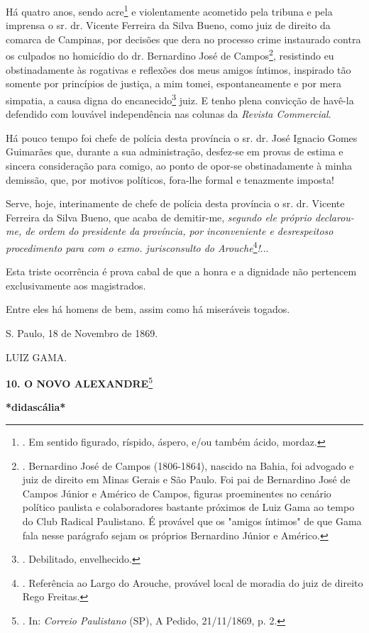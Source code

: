 Há quatro anos, sendo acre\footnote{. Em sentido figurado, ríspido,
  áspero, e/ou também ácido, mordaz.} e violentamente acometido pela
tribuna e pela imprensa o sr. dr. Vicente Ferreira da Silva Bueno, como
juiz de direito da comarca de Campinas, por decisões que dera no
processo crime instaurado contra os culpados no homicídio do dr.
Bernardino José de Campos\footnote{. Bernardino José de Campos
  (1806-1864), nascido na Bahia, foi advogado e juiz de direito em Minas
  Gerais e São Paulo. Foi pai de Bernardino José de Campos Júnior e
  Américo de Campos, figuras proeminentes no cenário político paulista e
  colaboradores bastante próximos de Luiz Gama ao tempo do Club Radical
  Paulistano. É provável que os "amigos íntimos" de que Gama fala nesse
  parágrafo sejam os próprios Bernardino Júnior e Américo.}, resistindo
eu obstinadamente às rogativas e reflexões dos meus amigos íntimos,
inspirado tão somente por princípios de justiça, a mim tomei,
espontaneamente e por mera simpatia, a causa digna do
encanecido\footnote{. Debilitado, envelhecido.} juiz. E tenho plena
convicção de havê-la defendido com louvável independência nas colunas da
\emph{Revista Commercial}.

Há pouco tempo foi chefe de polícia desta província o sr. dr. José
Ignacio Gomes Guimarães que, durante a sua administração, desfez-se em
provas de estima e sincera consideração para comigo, ao ponto de opor-se
obstinadamente à minha demissão, que, por motivos políticos, fora-lhe
formal e tenazmente imposta!

Serve, hoje, interinamente de chefe de polícia desta província o sr. dr.
Vicente Ferreira da Silva Bueno, que acaba de demitir-me, \emph{segundo
ele próprio declarou-me, de ordem do presidente da província, por
inconveniente e desrespeitoso procedimento para com o exmo.
jurisconsulto do Arouche}\footnote{. Referência ao Largo do Arouche,
  provável local de moradia do juiz de direito Rego Freitas.}\emph{!}...

Esta triste ocorrência é prova cabal de que a honra e a dignidade não
pertencem exclusivamente aos magistrados.

Entre eles há homens de bem, assim como há miseráveis togados.

S. Paulo, 18 de Novembro de 1869.

LUIZ GAMA.

\textbf{10. O NOVO ALEXANDRE}\footnote{. In: \emph{Correio Paulistano}
  (SP), A Pedido, 21/11/1869, p. 2.}

\textbf{*didascália*}

